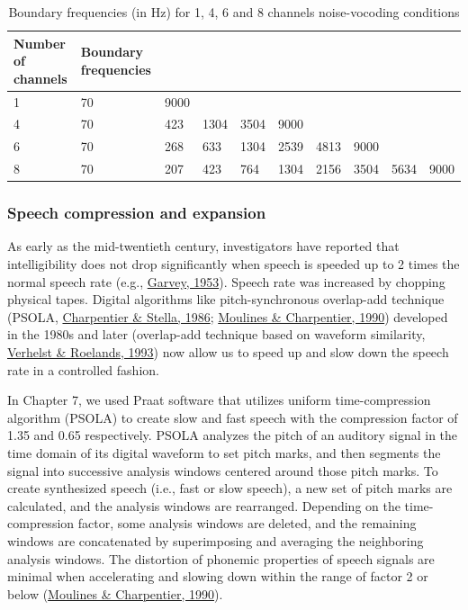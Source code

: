 \documentclass[a4paper, nobind]{templates/ociamthesis}
\begin{document}
\begin{table}[H]
\begin{center} 
\caption{Boundary frequencies (in Hz) for 1, 4, 6 and 8 channels noise-vocoding conditions} 
\label{frequencies} 
\vskip 0.12in
\begin{tabular}{llllllllll} 
\hline
Number of channels     &    Boundary frequencies \\
\hline
1   &   70    &   9000   &     &     &       &       &        &       &   \\

4   &   70    &   423   &   1304  &   3504  &   9000    &       &        &       &   \\

6   &   70    &   268   &   633   &   1304  &   2539    &   4813    &    9000    &       &   \\

8   &   70    &   207   &   423   &   764   &   1304    &   2156    &    3504    &   5634    &   9000\\
\hline
\end{tabular} 
\end{center} 
\end{table}

\hypertarget{speech-compression-and-expansion}{%
\subsubsection{Speech compression and expansion}\label{speech-compression-and-expansion}}

As early as the mid-twentieth century, investigators have reported that intelligibility does not drop significantly when speech is speeded up to 2 times the normal speech rate (e.g., \protect\hyperlink{ref-Garvey1953}{Garvey, 1953}).
Speech rate was increased by chopping physical tapes.
Digital algorithms like pitch-synchronous overlap-add technique (PSOLA, \protect\hyperlink{ref-Charpentier1986}{Charpentier \& Stella, 1986}; \protect\hyperlink{ref-Moulines1990}{Moulines \& Charpentier, 1990}) developed in the 1980s and later (overlap-add technique based on waveform similarity, \protect\hyperlink{ref-Verhelst1993}{Verhelst \& Roelands, 1993}) now allow us to speed up and slow down the speech rate in a controlled fashion.

In Chapter 7, we used Praat software that utilizes uniform time-compression algorithm (PSOLA) to create slow and fast speech with the compression factor of 1.35 and 0.65 respectively.
PSOLA analyzes the pitch of an auditory signal in the time domain of its digital waveform to set pitch marks, and then segments the signal into successive analysis windows centered around those pitch marks.
To create synthesized speech (i.e., fast or slow speech), a new set of pitch marks are calculated, and the analysis windows are rearranged.
Depending on the time-compression factor, some analysis windows are deleted, and the remaining windows are concatenated by superimposing and averaging the neighboring analysis windows.
The distortion of phonemic properties of speech signals are minimal when accelerating and slowing down within the range of factor 2 or below (\protect\hyperlink{ref-Moulines1990}{Moulines \& Charpentier, 1990}).
\end{document}
